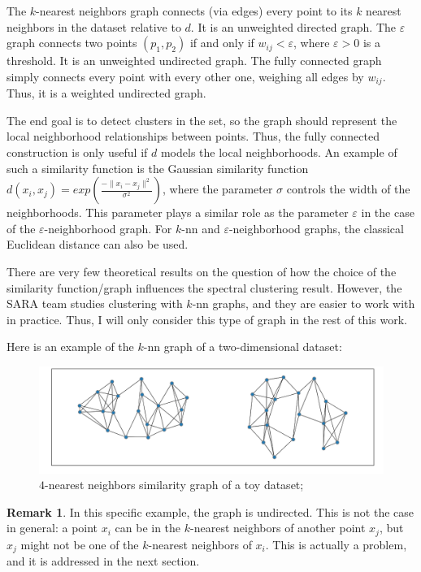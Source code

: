 \documentclass[a4paper,12pt]{article}
\theoremstyle{definition}
\newtheorem*{rem}{Remark}
\theoremstyle{plain}
\begin{document}
The $k$-nearest neighbors graph connects (via edges) every point to its $k$ nearest neighbors in the dataset relative to $d$. It is an unweighted directed graph. The $\varepsilon$ graph connects two points $(p_1,p_2)$ if and only if $w_{ij} < \varepsilon$, where $\varepsilon > 0$ is a threshold. It is an unweighted undirected graph. The fully connected graph simply connects every point with every other one, weighing all edges by $w_{ij}$. Thus, it is a weighted undirected graph.

The end goal is to detect clusters in the set, so the graph should represent the local neighborhood relationships between points. Thus, the fully connected construction is only useful if $d$ models the local neighborhoods. An example of such a similarity function is the Gaussian similarity function $d(x_i,x_j)=exp(\frac{-\lVert x_i - x_j \rVert^2}{\sigma^2})$, where the parameter $\sigma$ controls the width of the neighborhoods. This parameter plays a similar role as the parameter $\varepsilon$ in the case of the $\varepsilon$-neighborhood graph. For $k$-nn and $\varepsilon$-neighborhood graphs, the classical Euclidean distance can also be used.

There are very few theoretical results on the question of how the choice of the similarity function/graph influences the spectral clustering result. However, the SARA team studies clustering with $k$-nn graphs, and they are easier to work with in practice. Thus, I will only consider this type of graph in the rest of this work.

Here is an example of the $k$-nn graph of a two-dimensional dataset:

\begin{figure}[H]
	\centering
	\includegraphics[width=0.6\linewidth]{figures/simgraph_example}
	\caption{$4$-nearest neighbors similarity graph of a toy dataset;}
	\label{fig:sg_example}
\end{figure}
\begin{rem}
	
	In this specific example, the graph is undirected. This is not the case in general: a point $x_i$ can be in the $k$-nearest neighbors of another point $x_j$, but $x_j$ might not be one of the $k$-nearest neighbors of $x_i$. This is actually a problem, and it is addressed in the next section.
\end{rem}
\end{document}
